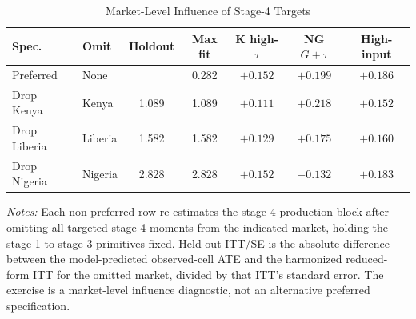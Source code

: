 \begin{table}[H]
\centering
\caption{Market-Level Influence of Stage-4 Targets}
\label{tab:struct_market_influence}
\begin{threeparttable}
\scriptsize
\begin{tabular}[t]{@{}llccccc@{}}
\toprule
Spec. & Omit & Holdout & Max fit & K high-$\tau$ & NG $G+\tau$ & High-input \\
\midrule
Preferred & None &  & 0.282 & $+0.152$ & $+0.199$ & $+0.186$ \\
Drop Kenya & Kenya & 1.089 & 1.089 & $+0.111$ & $+0.218$ & $+0.152$ \\
Drop Liberia & Liberia & 1.582 & 1.582 & $+0.129$ & $+0.175$ & $+0.160$ \\
Drop Nigeria & Nigeria & 2.828 & 2.828 & $+0.152$ & $-0.132$ & $+0.183$ \\
\bottomrule
\end{tabular}
\begin{tablenotes}
\footnotesize
\item \textit{Notes:} Each non-preferred row re-estimates the stage-4 production block after omitting all targeted stage-4 moments from the indicated market, holding the stage-1 to stage-3 primitives fixed. Held-out ITT/SE is the absolute difference between the model-predicted observed-cell ATE and the harmonized reduced-form ITT for the omitted market, divided by that ITT's standard error. The exercise is a market-level influence diagnostic, not an alternative preferred specification.
\end{tablenotes}
\end{threeparttable}
\end{table}
